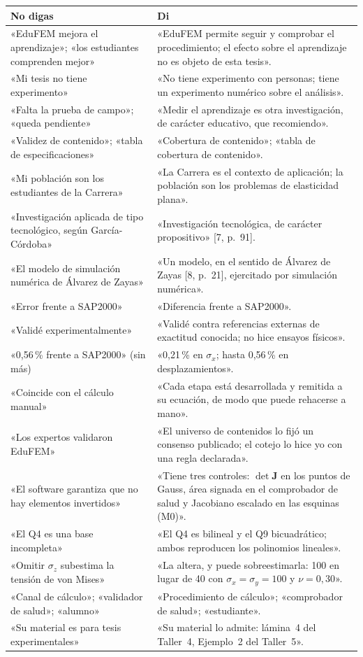 \documentclass[11pt,a4paper]{article}
\begin{document}
{\small
\begin{longtable}{@{}L{7.4cm}L{8.6cm}@{}}
\toprule
\textbf{\textcolor{mal}{No digas}} & \textbf{\textcolor{ok}{Di}}\\
\midrule\endhead
\bottomrule\endfoot
«EduFEM mejora el aprendizaje»; «los estudiantes comprenden mejor» & «EduFEM permite seguir y comprobar el procedimiento; el efecto sobre el aprendizaje no es objeto de esta tesis».\\
«Mi tesis no tiene experimento» & «No tiene experimento con personas; tiene un experimento numérico sobre el análisis».\\
«Falta la prueba de campo»; «queda pendiente» & «Medir el aprendizaje es otra investigación, de carácter educativo, que recomiendo».\\
«Validez de contenido»; «tabla de especificaciones» & «Cobertura de contenido»; «tabla de cobertura de contenido».\\
«Mi población son los estudiantes de la Carrera» & «La Carrera es el contexto de aplicación; la población son los problemas de elasticidad plana».\\
«Investigación aplicada de tipo tecnológico, según García-Córdoba» & «Investigación tecnológica, de carácter propositivo» [7, p.~91].\\
«El modelo de simulación numérica de Álvarez de Zayas» & «Un modelo, en el sentido de Álvarez de Zayas [8, p.~21], ejercitado por simulación numérica».\\
«Error frente a SAP2000» & «Diferencia frente a SAP2000».\\
«Validé experimentalmente» & «Validé contra referencias externas de exactitud conocida; no hice ensayos físicos».\\
«0,56\,\% frente a SAP2000» (sin más) & «0,21\,\% en $\sigma_x$; hasta 0,56\,\% en desplazamientos».\\
«Coincide con el cálculo manual» & «Cada etapa está desarrollada y remitida a su ecuación, de modo que puede rehacerse a mano».\\
«Los expertos validaron EduFEM» & «El universo de contenidos lo fijó un consenso publicado; el cotejo lo hice yo con una regla declarada».\\
«El software garantiza que no hay elementos invertidos» & «Tiene tres controles: $\det\mathbf{J}$ en los puntos de Gauss, área signada en el comprobador de salud y Jacobiano escalado en las esquinas (M0)».\\
«El Q4 es una base incompleta» & «El Q4 es bilineal y el Q9 bicuadrático; ambos reproducen los polinomios lineales».\\
«Omitir $\sigma_z$ subestima la tensión de von Mises» & «La altera, y puede sobreestimarla: 100 en lugar de 40 con $\sigma_x=\sigma_y=100$ y $\nu=0{,}30$».\\
«Canal de cálculo»; «validador de salud»; «alumno» & «Procedimiento de cálculo»; «comprobador de salud»; «estudiante».\\
«Su material es para tesis experimentales» & «Su material lo admite: lámina~4 del Taller~4, Ejemplo~2 del Taller~5».\\
\end{longtable}}
\end{document}

